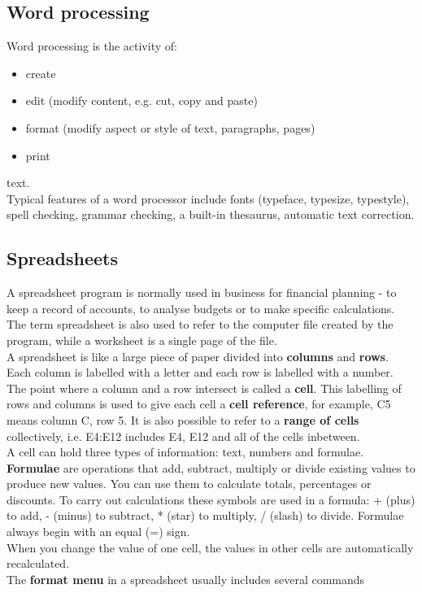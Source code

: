 \documentclass[a4paper,8pt]{article}
\begin{document}
\subsection{Word processing}
Word processing is the activity of:
\begin{itemize}
\item create
\item edit (modify content, e.g. cut, copy and paste)
\item format (modify aspect or style of text, paragraphs, pages)
\item print
\end{itemize}
text.\\
Typical features of a word processor include fonts (typeface, typesize, 
typestyle), spell checking, grammar checking, a built-in thesaurus, 
automatic text correction.
\subsection{Spreadsheets}
A spreadsheet program is normally used in business for financial planning - 
to keep a record of accounts, to analyse budgets or to make specific
calculations. The term spreadsheet is also used to refer to the computer 
file created by the program, while a worksheet is a single page of the file.\\
A spreadsheet is like a large piece of paper divided into \textbf{columns} 
and \textbf{rows}. 
Each column is labelled with a letter and each row is labelled with a number. 
The point where a column and a row intersect is called a \textbf{cell}. This
labelling of rows and columns is used to give each cell a 
\textbf{cell reference}, for example, C5 means column C, row 5. It is also
possible to refer to a \textbf{range of cells} collectively, i.e. E4:E12 
includes E4, E12 and all of the cells inbetween. \\A cell can hold three 
types of information: text, numbers and formulae.\\
\textbf{Formulae} are operations that add, subtract, multiply or divide existing
values to produce new values. You can use them to calculate totals,
percentages or discounts. To carry out calculations these symbols are used
in a formula: + (plus) to add, - (minus) to subtract, * (star) to multiply, 
/ (slash) to divide. Formulae always begin with an equal (=) sign.\\
When you change the value of one cell, the values in other cells are
automatically recalculated.\\
The \textbf{format menu} in a spreadsheet usually includes several commands 
\end{document}
